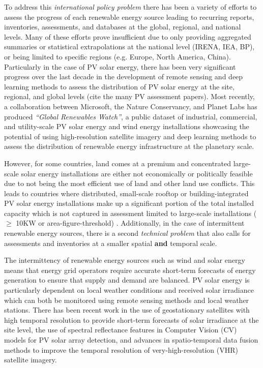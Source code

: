 \begin{multicols}{2}
To address this \textit{international policy problem} there has been a variety of efforts to assess the progress of each renewable energy source leading to recurring reports, inventories, assessments, and databases at the global, regional, and national levels. Many of these efforts prove insufficient due to only providing aggregated summaries or statistical extrapolations at the national level (IRENA, IEA, BP), or being limited to specific regions (e.g. Europe, North America, China). Particularly in the case of PV solar energy, there has been very significant progress over the last decade in the development of remote sensing and deep learning methods to assess the distribution of PV solar energy at the site, regional, and global levels (cite the many PV assessment papers).
Most recently, a collaboration between Microsoft, the Nature Conservancy, and Planet Labs has produced \textit{``Global Renewables Watch''}, a public dataset of industrial, commercial, and utility-scale PV solar energy and wind energy installations
showcasing the potential of using high-resolution satellite imagery and deep learning methods to assess the distribution of renewable energy infrastructure at the planetary scale. 

However, for some countries, land comes at a premium and concentrated large-scale solar energy installations are either not economically or politically feasible due to not being the most efficient use of land and other land use conflicts.
This leads to countries where distributed, small-scale rooftop or building-integrated PV solar energy installations make up a significant portion of the total installed capacity which is not captured in assessment limited to large-scale installations 
($\ge$ 10KW or area-figure-threshold) \cite{robinson_ms_planet_global_renewables_watch_2025}\cite{kruitwagen_global_inventory_pv_units_2021}. Additionally, in the case of intermittent renewable energy sources, there is a second \textit{technical problem} that also calls for assessments and inventories at a smaller spatial \textbf{and} temporal scale. 

The intermittency of renewable energy sources such as wind and solar energy means that energy grid operators require accurate short-term forecasts of energy generation to ensure that supply and demand are balanced. PV solar energy is particularly dependent on local weather conditions and received solar irradiance which can both be monitored using 
remote sensing methods and local weather stations. There has been recent work in the use of geostationary satellites with high temporal resolution to provide short-term forecasts of solar irradiance at the site level\cite{Bansal_ssl_nowcasting_2022}, 
the use of spectral reflectance features in Computer Vision (CV) models for PV solar array detection\cite{He_universal_pv_spectral_index_2024}, and advances in spatio-temporal data fusion methods to improve the temporal resolution of very-high-resolution (VHR) satellite imagery\cite{Tremenbert_Kasmi_pyPV_roof_2023}. 


\end{multicols}
